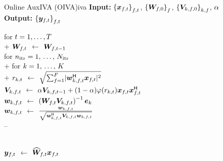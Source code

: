 \documentclass[sip,biber]{now-journal}
\begin{document}
\begin{algorithm}{Online AuxIVA (OIVA)}{iva}
  \textbf{Input:} ${\{\Obs _{\ft}\}} _{\ft}$, $ {\{\bm{W} _{f,0}\}} _{f}$, $ {\{\bm{V} _{k,f,0}\}} _{k,f}$, $ \alpha$\\
  \textbf{Output:} ${\{\Est _{\ft}\}} _{\ft}$
  \begin{pseudo}
    for $t = 1, \dots, T$ \\+
      {$\Demix _{\ft}$} $\gets$ $\Demix _{\ft[-1]}$ \ct{$\forall \freq$} \\

      for $n _{\mathrm{itr}} = 1,\, \dots,\, N _{\mathrm{itr}}$ \\+
        for $k = 1,\, \dots,\, K$ \\+
          {$r _{k,t}$} $\gets$ $\sqrt{\sum _{\freq = 1} ^{\Freq} \abs{\demix _{\src,\ft} ^{\hermite} \Obs _{\ft}} ^2}$ \ct{\eqref{eq:var}} \\
          {$\cov _{\src,\ft}    $} $\gets$ $\forget \cov _{\src,\ft[-1]} + (1 - \forget) \weight(\var _{\src,\tframe}) \Obs _{\ft} \Obs _{\ft} ^{\hermite}$ \ct{\eqref{eq:cov}, $\forall \freq$} \\
          {$\demix _{\src,\ft}$} $\gets$ $\left(\Demix _{\ft} \cov _{\src,\ft}\right) ^{-1} \eye _{\src}$ \ct{\eqref{eq:ip:proj}, $\forall \freq$} \\
          {$\demix _{\src,\ft}$} $\gets$ $\frac{\demix _{\src,\ft}}{\sqrt{\demix _{\src,\ft} ^{\hermite} \cov _{\src,\ft} \demix _{\src,\ft}}}$ \ct{\eqref{eq:ip:norm}, $\forall \freq$} \\--

       \ct{\eqref{eq:pb:w}, $\forall \freq$}\\
      {$\Est _{\ft}$} $\gets$ $\proj{\Demix }_{\ft} \Obs _{\ft}$ \ct{\eqref{eq:pb:y}, $\forall \freq$}
  \end{pseudo}
\end{algorithm}
\end{document}
